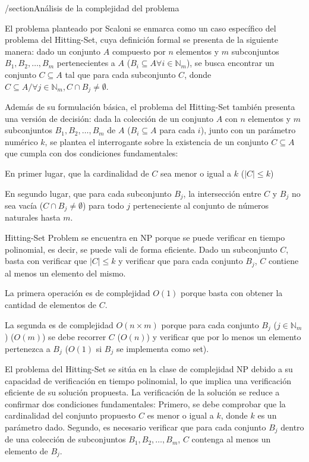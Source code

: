 /section{Análisis de la complejidad del problema}

El problema planteado por Scaloni se enmarca como un caso específico del problema del 
Hitting-Set, cuya definición formal se presenta de la siguiente manera: dado un 
conjunto $A$ compuesto por $n$ elementos y $m$ subconjuntos $B_{1}, B_{2}, \dots, B_{m}$ 
pertenecientes a $A$ ($B_{i}\subseteq A \forall i \in \mathbb{N}_{m}$), se busca encontrar un conjunto $C \subseteq A$ tal que para cada 
subconjunto $C$, donde $C \subseteq A / \forall j \in \mathbb{N}_{m},  C \cap B_{j}\neq \emptyset$. 

Además de su formulación básica, el problema del Hitting-Set también presenta una versión
de decisión: dada la colección de un conjunto $A$ con $n$ elementos y $m$ subconjuntos
 $B_{1}, B_{2}, \dots, B_{m}$ de $A$ ($B_{i}\subseteq A$ para cada $i$), junto con un 
 parámetro numérico $k$, se plantea el interrogante sobre la existencia de un conjunto 
 $C \subseteq A$ que cumpla con dos condiciones fundamentales:
 \item En primer lugar, que la cardinalidad de $C$ sea menor o igual a $k$ ($\left| C \right|\leq k$) 
 \item En segundo lugar, que para cada subconjunto $B_{j}$, la intersección entre $C$ y $B_{j}$ no sea 
 vacía ($C \cap B_{j} \neq \emptyset$) para todo $j$ perteneciente al conjunto de 
 números naturales hasta $m$.


Hitting-Set Problem se encuentra en NP porque se puede verificar en tiempo polinomial, es decir, se puede vali de forma eficiente.
Dado un subconjunto $C$, basta con verificar que $\left| C \right|\leq k$ y verificar que para cada
conjunto $B_{j}$, $C$ contiene al menos un elemento del mismo. 
\item La primera operación es de complejidad $O(1)$ porque basta con obtener la cantidad de elementos de $C$.
\item La segunda es de complejidad $O(n\times m)$ porque para cada conjunto $B_{j}$
($j \in \mathbb{N}_{m}$) ($O(m)$) se debe recorrer $C$ ($O(n)$) y verificar que por lo
menos un elemento pertenezca a $B_{j}$ ($O(1)$ si $B_{j}$ se implementa como set).


El problema del Hitting-Set se sitúa en la clase de complejidad NP debido a su capacidad 
de verificación en tiempo polinomial, lo que implica una verificación eficiente de su 
solución propuesta. La verificación de la solución se reduce a confirmar dos condiciones 
fundamentales: Primero, se debe comprobar que la cardinalidad del conjunto propuesto $C$ 
es menor o igual a $k$, donde $k$ es un parámetro dado. Segundo, es necesario 
verificar que para cada conjunto $B_{j}$ dentro de una colección de subconjuntos 
$B_{1}, B_{2}, \dots, B_{m}$, $C$ contenga al menos un elemento de $B_{j}$.

